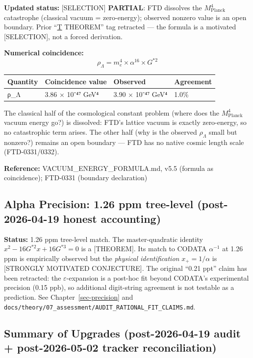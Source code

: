 \documentclass[
  11pt,
  letterpaper,
  twoside,
  openright]{book}
\begin{document}
\textbf{Updated status:} {[}SELECTION{]} \textbf{PARTIAL}: FTD dissolves
the \(M_\text{Planck}^4\) catastrophe (classical vacuum = zero-energy);
observed nonzero value is an open boundary. Prior ``\hyperref[t]{T}
THEOREM'' tag retracted --- the formula is a motivated {[}SELECTION{]},
not a forced derivation.

\textbf{Numerical coincidence:}
\[\rho_\Lambda = m_e^4 \times \alpha^{16} \times G^{*2}\]

\begin{longtable}[]{@{}llll@{}}
\toprule\noalign{}
Quantity & Coincidence value & Observed & Agreement \\
\midrule\noalign{}
\endhead
\bottomrule\noalign{}
\endlastfoot
ρ\_Λ & 3.86 × 10⁻⁴⁷ GeV⁴ & 3.90 × 10⁻⁴⁷ GeV⁴ & 1.0\% \\
\end{longtable}

The classical half of the cosmological constant problem (where does the
\(M_\text{Planck}^4\) vacuum energy go?) is dissolved: FTD's lattice
vacuum is exactly zero-energy, so no catastrophic term arises. The other
half (why is the observed \(\rho_\Lambda\) small but nonzero?) remains
an open boundary --- FTD has no native cosmic length scale
(FTD-0331/0332).

\textbf{Reference:} VACUUM\_ENERGY\_FORMULA.md, v5.5 (formula as
coincidence); FTD-0331 (boundary declaration)

\subsection{Alpha Precision: 1.26 ppm tree-level (post-2026-04-19 honest
accounting)}\label{alpha-precision-1.26-ppm-tree-level-post-2026-04-19-honest-accounting}

\textbf{Status:} 1.26 ppm tree-level match. The master-quadratic
identity \(x^2 - 16G^{*2}x + 16G^{*3} = 0\) is a {[}THEOREM{]}. Its
match to CODATA \(\alpha^{-1}\) at 1.26 ppm is empirically observed but
the \emph{physical identification} \(x_+ = 1/\alpha\) is {[}STRONGLY
MOTIVATED CONJECTURE{]}. The original ``0.21 ppt'' claim has been
retracted: the \(\varepsilon\)-expansion is a post-hoc fit beyond
CODATA's experimental precision (0.15 ppb), so additional digit-string
agreement is not testable as a prediction. See
Chapter~\ref{sec-precision} and
\texttt{docs/theory/07\_assessment/AUDIT\_RATIONAL\_FIT\_CLAIMS.md}.

\subsection{Summary of Upgrades (post-2026-04-19 audit + post-2026-05-02
tracker
reconciliation)}\label{summary-of-upgrades-post-2026-04-19-audit-post-2026-05-02-tracker-reconciliation}
\end{document}
